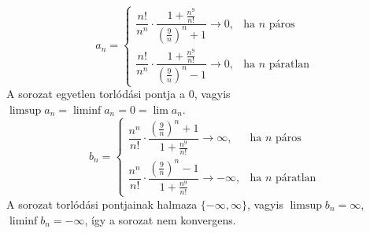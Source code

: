 \documentclass[11pt]{scrartcl}
\begin{document}
\[
	a_n = \begin{cases}
		\dfrac{n!}{n^n} \cdot \dfrac{1 + \frac{n^9}{n!}}{\left(\frac{9}{n}\right)^n + 1} \to 0,
		 & \text{ha } n \text{ páros}     \\[3ex]
		\dfrac{n!}{n^n} \cdot \dfrac{1 + \frac{n^9}{n!}}{\left(\frac{9}{n}\right)^n - 1} \to 0,
		 & \text{ha } n \text{ páratlan}
	\end{cases}
\]
A sorozat egyetlen torlódási pontja a $0$, vagyis
$\limsup a_n = \liminf a_n = 0 = \lim a_n$.
\[
	b_n = \begin{cases}
		\dfrac{n^n}{n!} \cdot \dfrac{\left(\frac{9}{n}\right)^n + 1}{1 + \frac{n^9}{n!}} \to \infty,
		 & \text{ha } n \text{ páros}     \\[3ex]
		\dfrac{n^n}{n!} \cdot \dfrac{\left(\frac{9}{n}\right)^n - 1}{1 + \frac{n^9}{n!}} \to -\infty,
		 & \text{ha } n \text{ páratlan}
	\end{cases}
\]
A sorozat torlódási pontjainak halmaza $\{-\infty, \infty\}$,
vagyis $\limsup b_n = \infty$, $\liminf b_n = -\infty$, így a sorozat nem konvergens.
\end{document}
